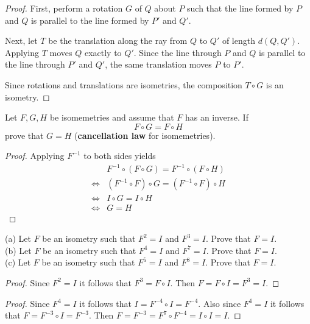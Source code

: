 \begin{proof}
    First, perform a rotation $G$ of $Q$ about $P$ such that the line formed by $P$ and $Q$ is parallel to 
    the line formed by $P'$ and $Q'$.
    
    Next, let $T$ be the translation along the ray from $Q$ to $Q'$ of length $d(Q, Q')$.
    Applying $T$ moves $Q$ exactly to $Q'$. 
    Since the line through $P$ and $Q$ is parallel to the line through $P'$ and $Q'$, the same translation
    moves $P$ to $P'$.
    
    Since rotations and translations are isometries, the composition $T \circ G$ is an isometry.
\end{proof}

\begin{tcolorbox}[title=Problem 3, breakable]
    Let $F, G, H$ be isomemetries and assume that $F$ has an inverse.
    If \[F \circ G = F \circ H\]
    prove that $G = H$ (\textbf{cancellation law} for isomemetries).
\end{tcolorbox}

\begin{proof}
    Applying $F^{-1}$ to both sides yields 
    \begin{align*}
        &F^{-1} \circ (F \circ G) = F^{-1} \circ (F \circ H) \\
        \iff& (F^{-1} \circ F) \circ G = (F^{-1} \circ F) \circ H \\
        \iff& I \circ G = I \circ H \\
        \iff& G = H
    \end{align*}
\end{proof}

\begin{tcolorbox}[title=Problem 4, breakable]
    (a) Let $F$ be an isometry such that $F^2 = I$ and $F^3 = I$.
        Prove that $F = I$. \\

    (b) Let $F$ be an isometry such that $F^4 = I$ and $F^7 = I$.
        Prove that $F = I$. \\

    (c) Let $F$ be an isometry such that $F^5 = I$ and $F^8 = I$.
        Prove that $F = I$.
\end{tcolorbox}

\begin{proof}
    Since $F^2 = I$ it follows that $F^3 = F \circ I$.
    Then $F = F \circ I  = F^3 = I$.
\end{proof}

\begin{proof}
    Since $F^4 = I$ it follows that $I = F^{-4} \circ I = F^{-4}$.
    Also since $F^4 = I$ it follows that $F = F^{-3} \circ I = F^{-3}$.
    Then $F = F^{-3} = F^{7} \circ F^{-4} = I \circ I = I$.
\end{proof}

